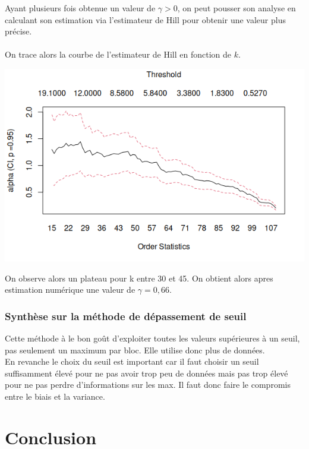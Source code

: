 \documentclass{article}
\theoremstyle{plain}
\theoremstyle{definition}
\theoremstyle{plain}
\begin{document}
Ayant plusieurs fois obtenue un valeur de $\gamma > 0$, on peut pousser son analyse en calculant son estimation via l'estimateur de Hill pour obtenir une valeur plus précise.
\\
\\
On trace alors la courbe de l'estimateur de Hill en fonction de $k$.

\begin{center}
	\includegraphics[scale=0.65]{./images/danishsad.png} 
\end{center}

On observe alors un plateau pour k entre 30 et 45. On obtient alors apres estimation numérique une valeur de $\gamma = 0,66$.

\subsubsection{Synthèse sur la méthode de dépassement de seuil}
Cette méthode à le bon goût d'exploiter toutes les valeurs supérieures à un seuil, pas seulement un maximum par bloc. Elle utilise donc plus de données.
\\
En revanche le choix du seuil est important car il faut choisir un seuil suffisamment élevé pour ne pas avoir trop peu de données mais pas trop élevé pour ne pas perdre d'informations sur les max. Il faut donc faire le compromis entre le biais et la variance.

\section{Conclusion}
\end{document}

